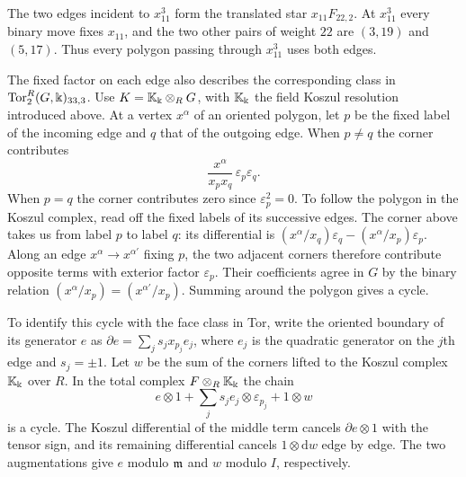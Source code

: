 \begin{example}
\begin{center}
\end{center}
The two edges incident to $x_{11}^3$ form the translated star $x_{11}F_{22,2}$.
At $x_{11}^3$ every binary move fixes $x_{11}$, and the two other
pairs of weight $22$ are $(3,19)$ and $(5,17)$. Thus every polygon
passing through $x_{11}^3$ uses both edges.

The fixed factor on each edge also describes the corresponding class in
$\operatorname{Tor}_2^R(G,\Bbbk)_{33,3}$. Use $K=\mathbb K_{\Bbbk}\otimes_R G$, with
$\mathbb K_{\Bbbk}$ the field Koszul resolution introduced above.
At a vertex $x^\alpha$ of an oriented
polygon, let $p$ be the fixed label of the incoming edge and $q$ that of
the outgoing edge. When $p\ne q$ the corner contributes
\[
 \frac{x^\alpha}{x_p x_q}\,\varepsilon_p\varepsilon_q.
\]
When $p=q$ the corner contributes zero since $\varepsilon_p^2=0$.
To follow the polygon in the Koszul complex, read off the fixed labels
of its successive edges. The corner above takes us from label $p$ to
label $q$: its differential is
$(x^\alpha/x_q)\varepsilon_q-(x^\alpha/x_p)\varepsilon_p$.
Along an edge $x^\alpha\to x^{\alpha'}$ fixing $p$, the two adjacent
corners therefore contribute opposite terms with exterior factor
$\varepsilon_p$. Their coefficients agree in $G$ by the binary relation
$(x^\alpha/x_p)=(x^{\alpha'}/x_p)$. Summing around the polygon gives a cycle.

To identify this cycle with the face class in Tor, write the oriented
boundary of its generator $e$ as $\partial e=\sum_j s_j x_{p_j}e_j$,
where $e_j$ is the quadratic generator on the $j$th edge and
$s_j=\pm1$. Let $w$ be the sum of the corners lifted to the Koszul
complex $\mathbb K_{\Bbbk}$ over $R$. In the total complex
$F\otimes_R\mathbb K_{\Bbbk}$ the chain
\[
 e\otimes1+\sum_j s_j e_j\otimes\varepsilon_{p_j}+1\otimes w
\]
is a cycle. The Koszul differential of the middle term cancels
$\partial e\otimes1$ with the tensor sign, and its remaining differential
cancels $1\otimes\mathrm{d}w$ edge by edge. The two augmentations give $e$ modulo
$\mathfrak m$ and $w$ modulo $I$, respectively.


\end{example}
